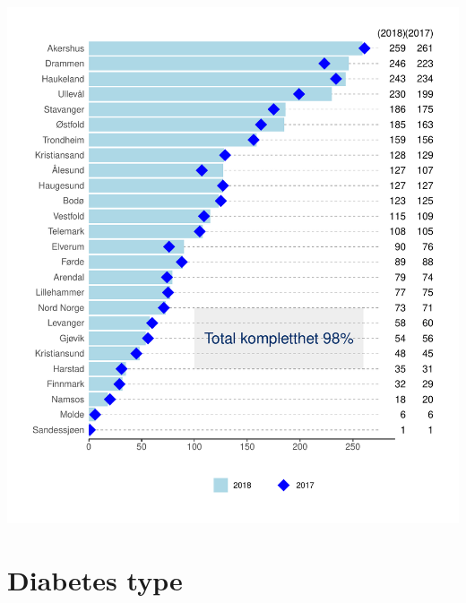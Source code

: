 \documentclass[]{article}
\begin{document}
\includegraphics{benchrap_files/figure-latex/pasient-1.pdf} \newpage

\hypertarget{diabetes-type}{%
\section{Diabetes type}\label{diabetes-type}}

 
  \providecommand{\huxb}[2]{\arrayrulecolor[RGB]{#1}\global\arrayrulewidth=#2pt}
  \providecommand{\huxvb}[2]{\color[RGB]{#1}\vrule width #2pt}
  \providecommand{\huxtpad}[1]{\rule{0pt}{\baselineskip+#1}}
  \providecommand{\huxbpad}[1]{\rule[-#1]{0pt}{#1}}
\end{document}
